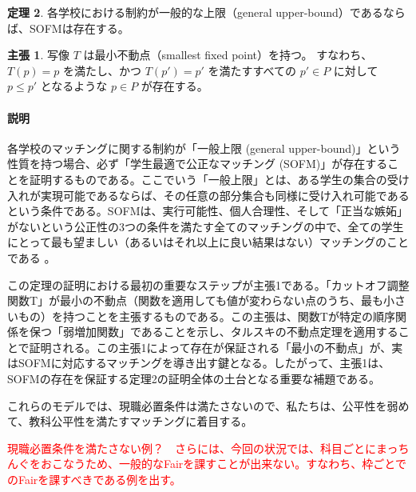 \documentclass[12pt, a4paper]{article}
\theoremstyle{definition}
\theoremstyle{remark}
\theoremstyle{plain}
\begin{document}






\textbf{定理 2}. 
各学校における制約が一般的な上限（general upper-bound）であるならば、SOFMは存在する。

\textbf{主張 1}. 
写像 $T$ は最小不動点（smallest fixed point）を持つ。
すなわち、$T(p) = p$ を満たし、かつ $T(p') = p'$ を満たすすべての $p' \in P$ に対して $p \leq p'$ となるような $p \in P$ が存在する。

\paragraph{説明}
各学校のマッチングに関する制約が「一般上限 (general upper-bound)」という性質を持つ場合、必ず「学生最適で公正なマッチング (SOFM)」が存在することを証明するものである。ここでいう「一般上限」とは、ある学生の集合の受け入れが実現可能であるならば、その任意の部分集合も同様に受け入れ可能であるという条件である。SOFMは、実行可能性、個人合理性、そして「正当な嫉妬」がないという公正性の3つの条件を満たす全てのマッチングの中で、全ての学生にとって最も望ましい（あるいはそれ以上に良い結果はない）マッチングのことである 。

この定理の証明における最初の重要なステップが主張1である。「カットオフ調整関数T」が最小の不動点（関数を適用しても値が変わらない点のうち、最も小さいもの）を持つことを主張するものである。この主張は、関数Tが特定の順序関係を保つ「弱増加関数」であることを示し、タルスキの不動点定理を適用することで証明される。この主張1によって存在が保証される「最小の不動点」が、実はSOFMに対応するマッチングを導き出す鍵となる。したがって、主張1は、SOFMの存在を保証する定理2の証明全体の土台となる重要な補題である。
\bigbreak

これらのモデルでは、現職必置条件は満たさないので、私たちは、公平性を弱めて、教科公平性を満たすマッチングに着目する。



\textcolor{red}{現職必置条件を満たさない例？　さらには、今回の状況では、科目ごとにまっちんぐをおこなうため、一般的なFairを課すことが出来ない。すなわち、枠ごとでのFairを課すべきである例を出す。}
\end{document}
